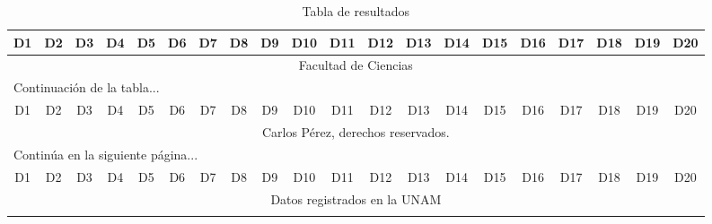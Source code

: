 \documentclass[letterpaper,11pt]{article}
\begin{document}
\begin{landscape}

\begin{center}

\begin{longtable}{|c|c|c|c|c|c|c|c|c|c|c|c|c|c|c|c|c|c|c|c|}

\caption{Tabla de resultados} \\
\hline
D1 & D2 & D3 & D4 & D5 & D6 & D7 & D8 & D9 & D10 & D11 & D12 & D13 & D14 & D15 & D16 & D17 & D18 & D19 & D20 \\
\hline
\multicolumn{20}{c}{Facultad de Ciencias} \\
\hline
\endfirsthead

\multicolumn{20}{l}{Continuación de la tabla...} \\
\hline
D1 & D2 & D3 & D4 & D5 & D6 & D7 & D8 & D9 & D10 & D11 & D12 & D13 & D14 & D15 & D16 & D17 & D18 & D19 & D20 \\
\hline
\endhead

\multicolumn{20}{c}{Carlos Pérez, derechos reservados.} \\
\multicolumn{20}{l}{Continúa en la siguiente página...} \\
\endfoot

D1 & D2 & D3 & D4 & D5 & D6 & D7 & D8 & D9 & D10 & D11 & D12 & D13 & D14 & D15 & D16 & D17 & D18 & D19 & D20 \\
\hline
\multicolumn{20}{c}{Datos registrados en la UNAM} \\
\caption{Tabla de resultados}
\endlastfoot


\end{longtable}
\end{center}
\end{landscape}
\end{document}
